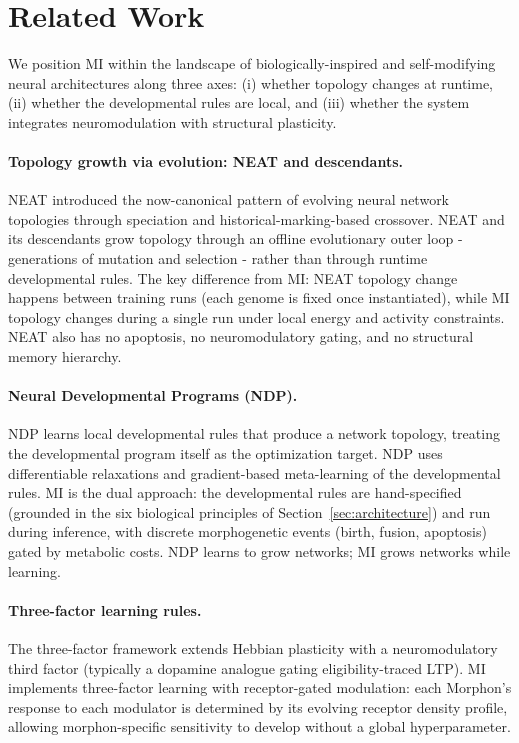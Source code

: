 \section{Related Work}
\label{sec:related}

We position MI within the landscape of biologically-inspired and self-modifying neural architectures along three axes: (i) whether topology changes at runtime, (ii) whether the developmental rules are local, and (iii) whether the system integrates neuromodulation with structural plasticity.

\paragraph{Topology growth via evolution: NEAT and descendants.}
NEAT \cite{stanley2002neat} introduced the now-canonical pattern of evolving neural network topologies through speciation and historical-marking-based crossover. NEAT and its descendants grow topology through an offline evolutionary outer loop - generations of mutation and selection - rather than through runtime developmental rules. The key difference from MI: NEAT topology change happens between training runs (each genome is fixed once instantiated), while MI topology changes during a single run under local energy and activity constraints. NEAT also has no apoptosis, no neuromodulatory gating, and no structural memory hierarchy.

\paragraph{Neural Developmental Programs (NDP).}
NDP \cite{najarro2023towards} learns local developmental rules that produce a network topology, treating the developmental program itself as the optimization target. NDP uses differentiable relaxations and gradient-based meta-learning of the developmental rules. MI is the dual approach: the developmental rules are hand-specified (grounded in the six biological principles of Section~\ref{sec:architecture}) and run during inference, with discrete morphogenetic events (birth, fusion, apoptosis) gated by metabolic costs. NDP learns to grow networks; MI grows networks while learning.

\paragraph{Three-factor learning rules.}
The three-factor framework \cite{fremaux2016neuromodulated,gerstner2018eligibility} extends Hebbian plasticity with a neuromodulatory third factor (typically a dopamine analogue gating eligibility-traced LTP). MI implements three-factor learning with receptor-gated modulation: each Morphon's response to each modulator is determined by its evolving receptor density profile, allowing morphon-specific sensitivity to develop without a global hyperparameter.

